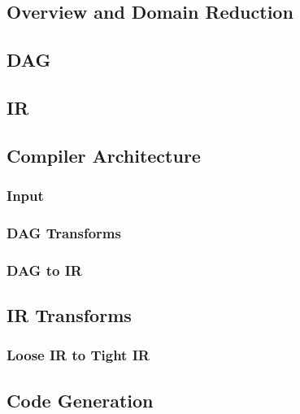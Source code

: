 
\subsection{Overview and Domain Reduction}


\subsection{DAG}

\subsection{IR}

\subsection{Compiler Architecture}
\subsubsection{Input}

\subsubsection{DAG Transforms}
% 

\subsubsection{DAG to IR}

\subsection{IR Transforms}

\subsubsection{Loose IR to Tight IR}


\subsection{Code Generation}
